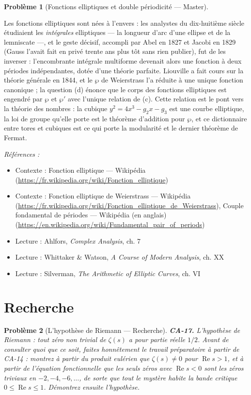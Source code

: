 \documentclass[11pt]{article}
\newtheorem{problem}{Problème}
\newenvironment{refs}{\par\small\noindent\emph{Références :}\begin{itemize}\setlength\itemsep{0pt}}{\end{itemize}\normalsize}
\begin{document}
\begin{problem}[{Fonctions elliptiques et double périodicité --- Master}]
\end{problem}

\noindent Les fonctions elliptiques sont nées à l'envers : les analystes du dix-huitième
siècle étudiaient les \textit{intégrales} elliptiques --- la longueur d'arc d'une ellipse et de la
lemniscate ---, et le geste décisif, accompli par Abel en 1827 et Jacobi en 1829 (Gauss l'avait fait
en privé trente ans plus tôt sans rien publier), fut de les inverser : l'encombrante intégrale
multiforme devenait alors une fonction à deux périodes indépendantes, dotée d'une théorie parfaite.
Liouville a fait cours sur la théorie générale en 1844, et le $ \wp $ de Weierstrass l'a réduite à
une unique fonction canonique ; la question (d) énonce que le corps des fonctions elliptiques est
engendré par $ \wp $ et $ \wp' $ avec l'unique relation de (c). Cette relation est le pont vers
la théorie des nombres : la cubique $ y^2 = 4x^3 - g_2x - g_3 $ est une courbe elliptique, la loi
de groupe qu'elle porte est le théorème d'addition pour $ \wp $, et ce dictionnaire entre tores et
cubiques est ce qui porte la modularité et le dernier théorème de Fermat.

\begin{refs}
\item Contexte : Fonction elliptique --- Wikipédia (\url{https://fr.wikipedia.org/wiki/Fonction_elliptique})
\item Contexte : Fonction elliptique de Weierstrass --- Wikipédia (\url{https://fr.wikipedia.org/wiki/Fonction_elliptique_de_Weierstrass}), Couple fondamental de périodes --- Wikipédia (en anglais) (\url{https://en.wikipedia.org/wiki/Fundamental_pair_of_periods})
\item Lecture : Ahlfors, \textit{Complex Analysis}, ch. 7
\item Lecture : Whittaker \& Watson, \textit{A Course of Modern Analysis}, ch. XX
\item Lecture : Silverman, \textit{The Arithmetic of Elliptic Curves}, ch. VI
\end{refs}

\bigskip


\section*{Recherche}

\begin{problem}[{L'hypothèse de Riemann --- Recherche}]
\textbf{CA-17.} L'hypothèse de Riemann : tout zéro non trivial de
$ \zeta(s) $ a pour partie réelle $ 1/2 $. Avant de consulter quoi que ce soit, faites
honnêtement le travail préparatoire à partir de CA-14 : montrez à partir du produit eulérien que
$ \zeta(s) \ne 0 $ pour $ \operatorname{Re} s > 1 $, et à partir de l'équation fonctionnelle
que les seuls zéros avec $ \operatorname{Re} s < 0 $ sont les zéros triviaux en
$ -2, -4, -6, \dots $, de sorte que tout le mystère habite la bande critique
$ 0 \le \operatorname{Re} s \le 1 $. Démontrez ensuite l'hypothèse.
\end{problem}
\end{document}
